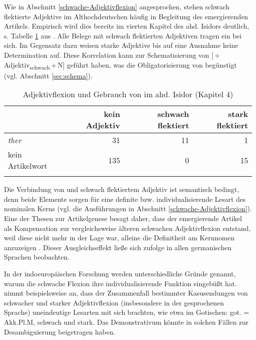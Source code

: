 Wie in Abschnitt \ref{schwache-Adjektivflexion} angesprochen, stehen schwach flektierte Adjektive im Althochdeutschen häufig in Begleitung des emergierenden Artikels. Empirisch wird dies bereits im vierten Kapitel des ahd. Isidors  deutlich, s. Tabelle \ref{tab:adjektive-flick2016} aus \textcite{Flick2018}. Alle Belege mit schwach flektierten Adjektiven tragen ein  bei sich. Im Gegensatz dazu weisen starke Adjektive bis auf eine Ausnahme keine Determination auf. Diese Korrelation kann zur Schematisierung von [\,+\,Adjektiv\textsubscript{schwach}\,+\,N] geführt  haben, was die Obligatorisierung von  begünstigt (vgl. Abschnitt \ref{sec:schema}). 

\begin{table}
\centering
\begin{tabular}{lrrr}
\lsptoprule
                 & {kein Adjektiv} & {schwach flektiert} & {stark flektiert} \\ \midrule
\textit{ther}    & 31                     & 11                         & 1                        \\
kein Artikelwort & 135                    & 0                          & 15                       \\ \lspbottomrule
\end{tabular}
\caption{Adjektivflexion und Gebrauch von  im ahd. Isidor (Kapitel 4) \parencite{Flick2018}}
\label{tab:adjektive-flick2016}
\end{table}

Die Verbindung von  und schwach flektiertem Adjektiv ist semantisch bedingt, denn beide Elemente sorgen für eine definite bzw. individualisierende Lesart des nominalen Kerns  (vgl. die Ausführungen in Abschnitt \ref{schwache-Adjektivflexion}). Eine der Thesen zur Artikelgenese besagt daher, dass der emergierende Artikel als Kompensation zur vergleichsweise älteren schwachen Adjektivflexion entstand, weil diese nicht mehr in der Lage war, alleine die Definitheit am Kernnomen anzuzeigen \parencite{Heinrichs1954,Ebert1978,Kovari1984}. Dieser Ausgleichseffekt ließe sich \textcite[81]{Heinrichs1954} zufolge in allen germanischen Sprachen beobachten. 

In der indoeuropäischen Forschung werden unterschiedliche Gründe genannt, warum die schwache Flexion ihre individualisierende Funktion eingebüßt hat. \textcite[24]{Kovari1984} nimmt beispielsweise an, dass der Zusammenfall bestimmter Kasusendungen von schwacher und starker Adjektivflexion (insbesondere in der gesprochenen Sprache) uneindeutige Lesarten mit sich brachten, wie etwa im Gotischen: got.  = Akk.Pl.M, schwach und stark. Das Demonstrativum könnte in solchen Fällen zur Desambiguierung beigetragen haben. 

